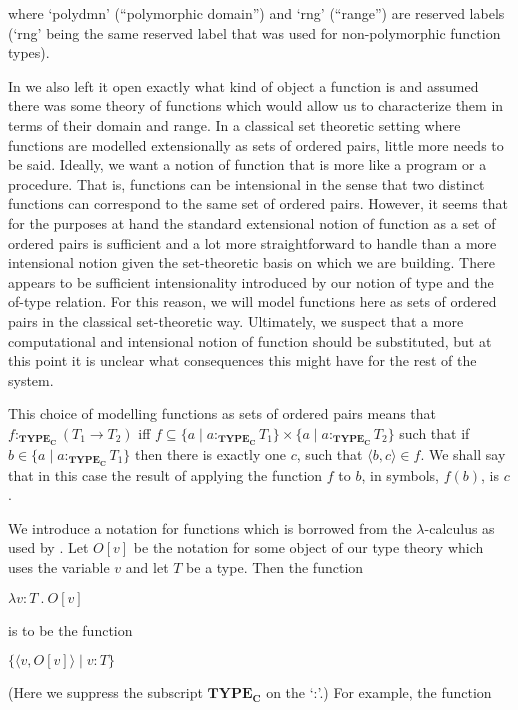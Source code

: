 where `polydmn' (``polymorphic domain'') and `rng' (``range'') are
reserved labels (`rng' being the same reserved label that was used for
non-polymorphic function types).


In \cite{Cooper2012} we also left it open exactly what kind of object a
function is and assumed there was some theory of functions which would
allow us to characterize them in terms of their domain and range.  In
a classical set theoretic setting where functions are modelled
extensionally as sets of ordered pairs, little more needs to be said.
Ideally, we want a notion of function
that is more like a program or a procedure.  That is, functions can be
intensional in the sense that two distinct functions can correspond to
the same set of ordered pairs. However, it seems that for the purposes
at hand the standard extensional notion of function as a set of
ordered pairs is sufficient and a lot more straightforward to handle
than a more intensional notion given the set-theoretic basis on which
we are building.  There appears to be sufficient intensionality
introduced by our notion of type and the of-type relation.  For this
reason, we will model functions here as sets of ordered pairs in the
classical set-theoretic way.  Ultimately, we suspect that a more
computational and intensional notion of function should be
substituted, but at this point it is unclear what consequences this
might have for the rest of the system.

This choice of modelling functions as sets of ordered pairs means that
$f:_{\mathbf{TYPE_C}}(T_1\rightarrow T_2)$ iff $f\subseteq \{a\mid
  a:_{\mathbf{TYPE_C}}T_1\} \times \{a\mid a:_{\mathbf{TYPE_C}}T_2\}$
  such that if $b \in \{a\mid
  a:_{\mathbf{TYPE_C}}T_1\}$ then there is exactly one $c$, such that
  $\langle b,c\rangle\in f$.  We shall say that in this case the
  result of applying the function $f$ to $b$, in symbols, $f(b)$, is
  $c$.

We introduce a notation for functions which is borrowed from the
$\lambda$-calculus as used by \cite{Montague1973}.  Let $O[v]$ be the
notation for some object of our type theory which uses the variable
$v$ and let $T$ be a type.  Then the function

$\lambda v:T\ .\ O[v]$ 

is to be the function

$\{\langle v,O[v]\rangle\mid v:T\}$

(Here we suppress the subscript $\mathbf{TYPE_C}$ on the `:'.)  For
example, the function

